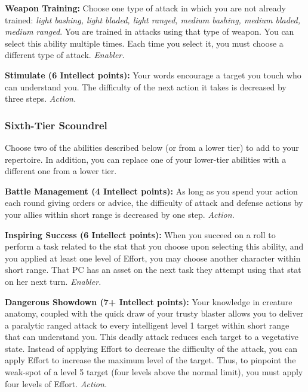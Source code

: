\documentclass[a4paper,10pt,final,twocolumn,oneside]{book}
\newcommand{\itemAbility}[2]{\textcolor{25gray}{\textbullet\textbf{ #1:}}{ #2}\par}
\newcommand{\enabler}{\textit{ Enabler.}}
\newcommand{\action}{\textit{ Action.}}
\begin{document}
\itemAbility{Weapon Training}{Choose one type of attack in which you are not already trained: \textit{light bashing, light bladed, light ranged, medium bashing, medium bladed, medium ranged}. You are trained in attacks using that type of weapon. You can select this ability multiple times. Each time you select it, you must choose a different type of attack.\enabler}

\itemAbility{Stimulate (6 Intellect points)}{Your words encourage a target you touch who can understand you. The difficulty of the next action it takes is decreased by three steps.\action}


\subsubsection*{Sixth-Tier Scoundrel}
\label{subsub:scoundrelSixthTier}

Choose two of the abilities described below (or from a lower tier) to add to your repertoire. In addition, you can replace one of your lower-tier abilities with a different one from a lower tier.

\itemAbility{Battle Management (4 Intellect points)}{As long as you spend your action each round giving orders or advice, the difficulty of attack and defense actions by your allies within short range is decreased by one step.\action}

\itemAbility{Inspiring Success (6 Intellect points)}{When you succeed on a roll to perform a task related to the stat that you choose upon selecting this ability, and you applied at least one level of Effort, you may choose another character within short range. That PC has an asset on the next task they attempt using that stat on her next turn.\enabler}

\itemAbility{Dangerous Showdown (7+ Intellect points)}{Your knowledge in creature anatomy, coupled with the quick draw of your trusty blaster allows you to deliver a paralytic ranged attack to every intelligent level 1 target within short range that can understand you. This deadly attack reduces each target to a vegetative state. Instead of applying Effort to decrease the difficulty of the attack, you can apply Effort to increase the maximum level of the target. Thus, to pinpoint the weak-spot of a level 5 target (four levels above the normal limit), you must apply four levels of Effort.\action}
\end{document}
